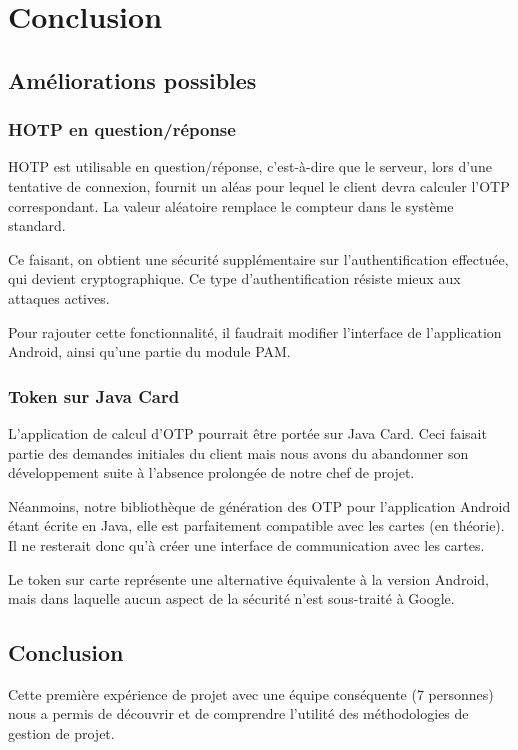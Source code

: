 \chapter{Conclusion}




\section{Améliorations possibles}
\subsection{HOTP en question/réponse}
HOTP est utilisable en question/réponse, c'est-à-dire que le serveur, lors d'une tentative de connexion, fournit un aléas pour lequel le client devra calculer l'OTP correspondant. La valeur aléatoire remplace le compteur dans le système standard.

Ce faisant, on obtient une sécurité supplémentaire sur l'authentification effectuée, qui devient cryptographique. Ce type d'authentification résiste mieux aux attaques actives.

Pour rajouter cette fonctionnalité, il faudrait modifier l'interface de l'application Android, ainsi qu'une partie du module PAM.

\subsection{Token sur Java Card}

L'application de calcul d'OTP pourrait être portée sur Java Card. Ceci faisait partie des demandes initiales du client mais nous avons du abandonner son développement suite à l'absence prolongée de notre chef de projet.

Néanmoins, notre bibliothèque de génération des OTP pour l'application Android étant écrite en Java, elle est parfaitement compatible avec les cartes (en théorie). Il ne resterait donc qu'à créer une interface de communication avec les cartes.

Le token sur carte représente une alternative équivalente à la version Android, mais dans laquelle aucun aspect de la sécurité n'est sous-traité à Google.


\section{Conclusion}

Cette première expérience de projet avec une équipe conséquente (7 personnes) nous a permis de découvrir et de comprendre l'utilité des méthodologies de gestion de projet.

